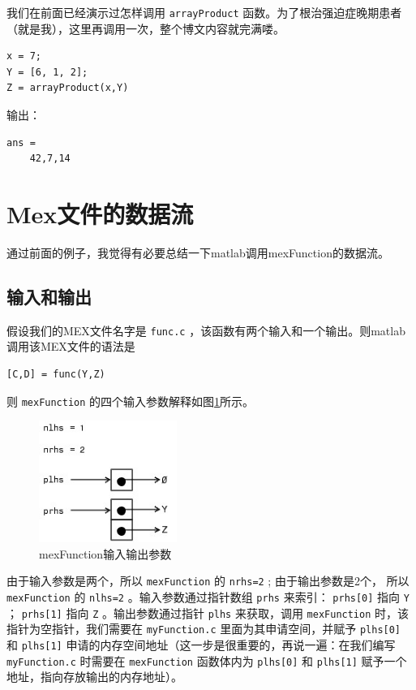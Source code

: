 \documentclass[10pt,a4paper,UTF8]{article}
\begin{document}
我们在前面已经演示过怎样调用 \texttt{arrayProduct} 函数。为了根治强迫症晚期患者（就是我），这里再调用一次，整个博文内容就完满喽。

\lstset{language=matlab,label= ,caption= ,captionpos=b,numbers=none}
\begin{lstlisting}
x = 7;
Y = [6, 1, 2];
Z = arrayProduct(x,Y)
\end{lstlisting}

输出：
\lstset{language=matlab,label= ,caption= ,captionpos=b,numbers=none}
\begin{lstlisting}
ans =
    42,7,14
\end{lstlisting}
\section{Mex文件的数据流}
\label{sec:orgheadline10}


通过前面的例子，我觉得有必要总结一下matlab调用mexFunction的数据流。

\subsection{输入和输出}
\label{sec:orgheadline8}


假设我们的MEX文件名字是 \texttt{func.c} ，该函数有两个输入和一个输出。则matlab调用该MEX文件的语法是
\lstset{language=matlab,label= ,caption= ,captionpos=b,numbers=none}
\begin{lstlisting}
[C,D] = func(Y,Z)
\end{lstlisting}
则 \texttt{mexFunction} 的四个输入参数解释如图\ref{fig:orgparagraph1}所示。
\begin{figure}[htb]
\centering
\includegraphics[width=0.4\textwidth]{../../img/20151110mexinputoutput.jpg}
\caption{\label{fig:orgparagraph1}
mexFunction输入输出参数}
\end{figure}

由于输入参数是两个，所以 \texttt{mexFunction} 的 \texttt{nrhs=2} ; 由于输出参数是2个， 所以 \texttt{mexFunction} 的 \texttt{nlhs=2} 。输入参数通过指针数组 \texttt{prhs} 来索引： \texttt{prhs[0]} 指向 \texttt{Y} ； \texttt{prhs[1]} 指向 \texttt{Z} 。输出参数通过指针 \texttt{plhs} 来获取，调用 \texttt{mexFunction} 时，该指针为空指针，我们需要在 \texttt{myFunction.c} 里面为其申请空间，并赋予 \texttt{plhs[0]} 和 \texttt{plhs[1]} 申请的内存空间地址（这一步是很重要的，再说一遍：在我们编写 \texttt{myFunction.c} 时需要在 \texttt{mexFunction} 函数体内为 \texttt{plhs[0]} 和 \texttt{plhs[1]} 赋予一个地址，指向存放输出的内存地址）。
\end{document}
